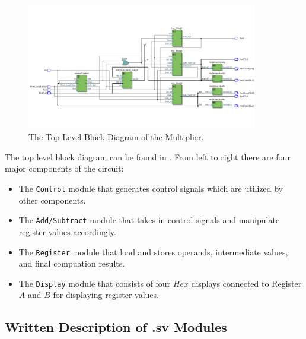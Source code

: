 \documentclass{article}
\begin{document}
\begin{figure}[h]
    \includegraphics[width=0.9\textwidth]{src/top_level.png}
    \caption{The Top Level Block Diagram of the Multiplier.}
    \label{fig:top_level}
\end{figure}

The top level block diagram can be found in . From left to right there are four major components of the circuit: 
\begin{itemize}
    \item The \texttt{Control} module that generates control signals which are utilized by other components.
    \item The \texttt{Add/Subtract} module that takes in control signals and manipulate register values accordingly.
    \item The \texttt{Register} module that load and stores operands, intermediate values, and final compuation results.
    \item The \texttt{Display} module that consists of four $Hex$ displays connected to Register $A$ and $B$ for displaying register values.
    
\end{itemize}


\subsection{Written Description of .sv Modules}
\end{document}
